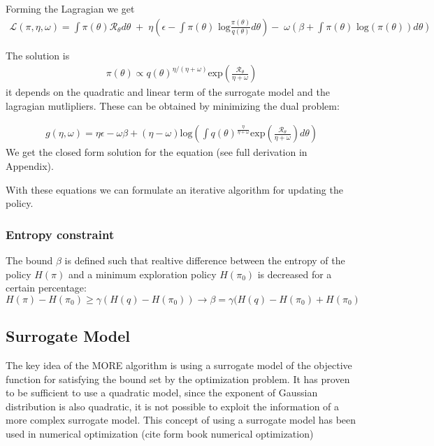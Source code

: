 Forming the Lagragian we get
\begin{align} \mathcal{L}(\pi, \eta, \omega) = 
\int \pi(\theta) \mathcal{R}_{\theta} d\theta \; + \; 
\eta  \left(\epsilon - \int \pi(\theta) \text{ log}
 \frac{\pi(\theta)}{q(\theta)} d\theta\right)
 - \; \omega \left(\beta + \int \pi(\theta) \text{ log}(\pi(\theta)) d\theta\right)
\end{align}

The solution is
\begin{align}
\pi(\theta) \propto q(\theta)^{\eta/(\eta+\omega)} 
\text{exp}\left(\frac{\mathcal{R}_\theta}{\eta + \omega}\right)
\end{align}
it depends on the quadratic and linear term of the surrogate model and the
lagragian mutlipliers. These can be obtained by minimizing the dual problem:

\begin{align}
  g(\eta,\omega) = \eta\epsilon - \omega\beta + (\eta - \omega) \text{log}
\left(\int q(\theta)^{\frac{\eta}{\eta + \omega}}
  \text{exp}\left(\frac{\mathcal{R}_\theta}{\eta + \omega}\right) d\theta \right)
\end{align}
We get the closed form solution for the equation
(see full derivation in Appendix).

With these equations we can formulate an iterative algorithm for updating the policy.

\subsubsection{Entropy constraint}
The bound $\beta$ is defined such that realtive difference between the entropy
of the policy $H(\pi)$ and a minimum exploration policy $H(\pi_0)$ is decreased
for a certain percentage:
$$ H(\pi) - H(\pi_0) \geq \gamma (H(q) - H(\pi_0))
\rightarrow \beta = \gamma (H(q) - H(\pi_0) + H(\pi_0) $$

\subsection{Surrogate Model}
The key idea of the MORE algorithm is using a surrogate model of the objective function
for satisfying the bound set by the optimization problem. It has proven to be
sufficient to use a quadratic model, since the exponent of Gaussian distribution
is also quadratic, it is not possible to exploit the information of a more
complex surrogate model. This concept of using a surrogate model has been used
in numerical optimization (cite form book numerical optimization)

